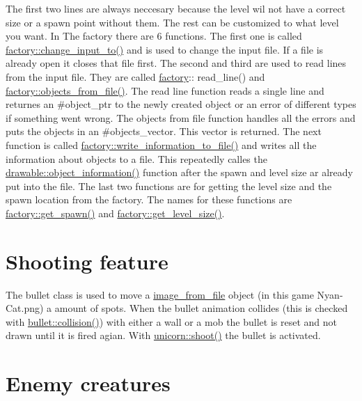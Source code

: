 The first two lines are always neccesary because the level wil not have a correct size or a spawn point without them. The rest can be customized to what level you want. In The factory there are 6 functions. The first one is called \hyperlink{classfactory_a9e164a8fbb65188de99c39d55d7cc384}{factory\+::change\+\_\+input\+\_\+to()} and is used to change the input file. If a file is already open it closes that file first. The second and third are used to read lines from the input file. They are called \hyperlink{classfactory}{factory}\+:\+: read\+\_\+line() and \hyperlink{classfactory_afb2fad4ac9b0f39b1bfc3f3fc8d218b6}{factory\+::objects\+\_\+from\+\_\+file()}. The read line function reads a single line and returnes an \#object\+\_\+ptr to the newly created object or an error of different types if something went wrong. The objects from file function handles all the errors and puts the objects in an \#objects\+\_\+vector. This vector is returned. The next function is called \hyperlink{classfactory_af17f2a44d75cf8ccf712384341c2fcde}{factory\+::write\+\_\+information\+\_\+to\+\_\+file()} and writes all the information about objects to a file. This repeatedly calles the \hyperlink{classdrawable_a2ed0f8bb53f33477f7722efa7bb24583}{drawable\+::object\+\_\+information()} function after the spawn and level size ar already put into the file. The last two functions are for getting the level size and the spawn location from the factory. The names for these functions are \hyperlink{classfactory_a3c3a039b8f76a947267dbe659166550b}{factory\+::get\+\_\+spawn()} and \hyperlink{classfactory_af9bb026273b34fc032ca5ac73d457611}{factory\+::get\+\_\+level\+\_\+size()}.\hypertarget{index_bullet}{}\section{Shooting feature}\label{index_bullet}
The bullet class is used to move a \hyperlink{classimage__from__file}{image\+\_\+from\+\_\+file} object (in this game Nyan-\/\+Cat.\+png) a amount of spots. When the bullet animation collides (this is checked with \hyperlink{classbullet_ab7e5c677bbd642df24a2251bb58249b7}{bullet\+::collision()}) with either a wall or a mob the bullet is reset and not drawn until it is fired agian. With \hyperlink{classunicorn_af448a3fa5fc5f09254b50afa151ce42b}{unicorn\+::shoot()} the bullet is activated.\hypertarget{index_mob}{}\section{Enemy creatures}\label{index_mob}
